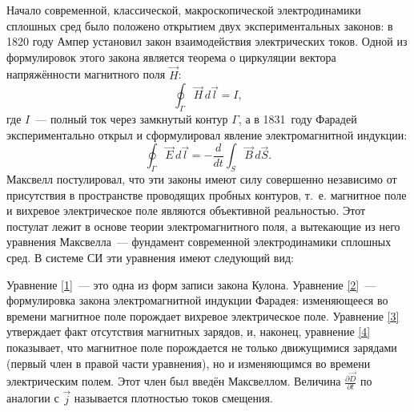 \newcommand*{\ddt}[1]{\frac{\partial #1}{\partial t}}


Начало современной, классической, макроскопической электродинамики сплошных сред было положено открытием двух
экспериментальных законов: в 1820 году Ампер установил закон взаимодействия электрических токов. Одной из формулировок
этого закона является теорема о циркуляции вектора напряжённости магнитного поля $\vec{H}$:
\[
\oint_{\Gamma}\vec{H}\,d\vec{l}=I,
\]
где $I$~--- полный ток через замкнутый контур $\Gamma$, а в 1831~году Фарадей экспериментально открыл и сформулировал
явление электромагнитной индукции:
\[
\oint_{\Gamma}\vec{E}\,d\vec{l}=-\frac{d}{dt}\int_S\vec{B}\, d\vec{S}.
\]
Максвелл постулировал, что эти законы имеют силу совершенно независимо от присутствия в пространстве проводящих пробных
контуров, т.~е. магнитное поле и вихревое электрическое поле являются объективной реальностью. Этот постулат лежит в
основе теории электромагнитного поля, а вытекающие из него уравнения Максвелла~--- фундамент современной электродинамики
сплошных сред. В системе СИ эти уравнения имеют следующий вид:



Уравнение \eqref{1}~--- это одна из форм записи закона Кулона. Уравнение \eqref{2}~--- формулировка закона
электромагнитной индукции Фарадея: изменяющееся во времени магнитное поле порождает вихревое электрическое поле.
Уравнение \eqref{3} утверждает факт отсутствия магнитных зарядов, и, наконец, уравнение \eqref{4} показывает, что магнитное поле
порождается не только движущимися зарядами (первый член в правой части уравнения), но и изменяющимся во времени
электрическим полем. Этот член был введён Максвеллом. Величина $\ddt{\vec{D}}$ по аналогии с $\vec{j}$ называется плотностью
токов смещения.

